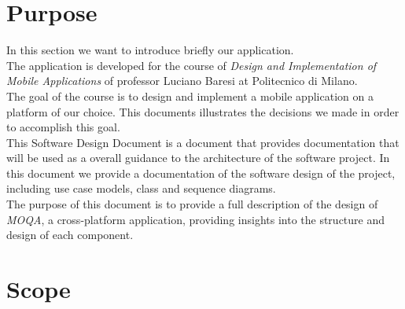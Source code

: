 \section{Purpose}

In this section we want to introduce briefly our application.\\

The application is developed for the course of \textit{Design and Implementation of Mobile
Applications} of professor Luciano Baresi at Politecnico di Milano.\\
The goal of the course is to design and implement a mobile application on a platform of our choice.
This documents illustrates the decisions we made in order to accomplish this goal.\\

This Software Design Document is a document that provides documentation that will be
used as a overall guidance to the architecture of the software project. In this document we
provide a documentation of the software design of the project, including use case models,
class and sequence diagrams.\\

The purpose of this document is to provide a full description of the design of \textit{MOQA}, a cross-platform application, providing insights into the structure and design of each component.

\section{Scope}